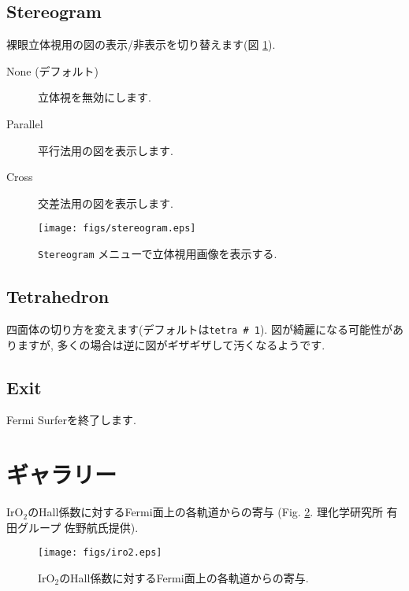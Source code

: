 \documentclass[12pt]{jarticle}
\begin{document}
\subsection{Stereogram}

裸眼立体視用の図の表示/非表示を切り替えます(図 \ref{fig_stereogram}). 
\begin{description}
\item[None (デフォルト)] 立体視を無効にします. 
\item[Parallel] 平行法用の図を表示します. 
\item[Cross] 交差法用の図を表示します. 
\end{description}

\begin{figure}[!ht]
  \texttt{[image: figs/stereogram.eps]}
  \caption{\texttt{Stereogram} メニューで立体視用画像を表示する.}
  \label{fig_stereogram}
\end{figure}

\subsection{Tetrahedron}

四面体の切り方を変えます(デフォルトは\texttt{tetra \# 1}).
図が綺麗になる可能性がありますが, 
多くの場合は逆に図がギザギザして汚くなるようです. 

\subsection{Exit}

Fermi Surferを終了します. 

\section{ギャラリー}

IrO$_2$のHall係数に対するFermi面上の各軌道からの寄与
(Fig. \ref{fig_iro2}. 理化学研究所 有田グループ 佐野航氏提供). 

\begin{figure}[!ht]
  \texttt{[image: figs/iro2.eps]}
  \caption{IrO$_2$のHall係数に対するFermi面上の各軌道からの寄与.}
  \label{fig_iro2}
\end{figure}
\end{document}
